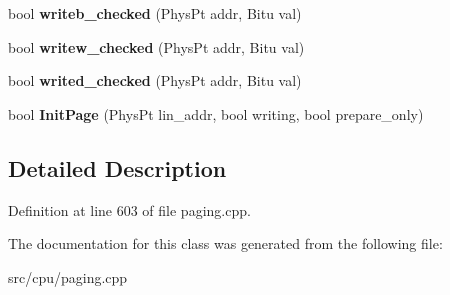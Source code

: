 \begin{DoxyCompactItemize}
\item 
\hypertarget{classNewInitPageHandler_a342ecdf4f9a89943a737464c4f86012e}{bool {\bfseries writeb\-\_\-checked} (Phys\-Pt addr, Bitu val)}\label{classNewInitPageHandler_a342ecdf4f9a89943a737464c4f86012e}

\item 
\hypertarget{classNewInitPageHandler_a03301e03d6dc87b05c36b29685b30d92}{bool {\bfseries writew\-\_\-checked} (Phys\-Pt addr, Bitu val)}\label{classNewInitPageHandler_a03301e03d6dc87b05c36b29685b30d92}

\item 
\hypertarget{classNewInitPageHandler_a192d6438cfe0114d22a2fb7f3329600a}{bool {\bfseries writed\-\_\-checked} (Phys\-Pt addr, Bitu val)}\label{classNewInitPageHandler_a192d6438cfe0114d22a2fb7f3329600a}

\item 
\hypertarget{classNewInitPageHandler_a1ed4fb6bc908d2a5b4a8c0b486be0852}{bool {\bfseries Init\-Page} (Phys\-Pt lin\-\_\-addr, bool writing, bool prepare\-\_\-only)}\label{classNewInitPageHandler_a1ed4fb6bc908d2a5b4a8c0b486be0852}

\end{DoxyCompactItemize}


\subsection{Detailed Description}


Definition at line 603 of file paging.\-cpp.



The documentation for this class was generated from the following file\-:\begin{DoxyCompactItemize}
\item 
src/cpu/paging.\-cpp\end{DoxyCompactItemize}
